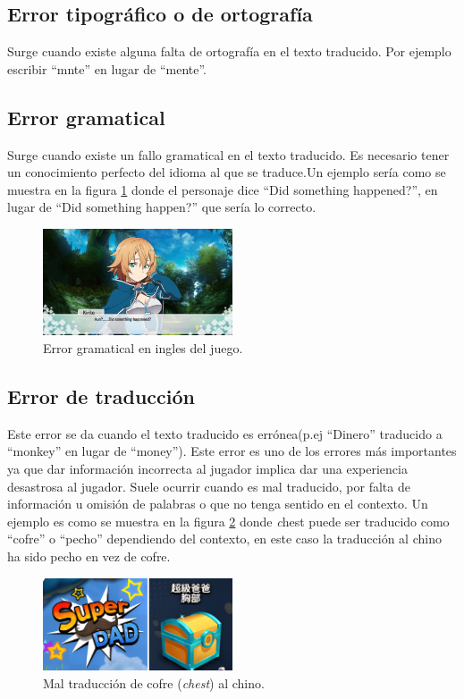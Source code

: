 \subsection{Error tipográfico o de ortografía}\label{ErrorTypo}
Surge cuando existe alguna falta de ortografía en el texto traducido. Por ejemplo escribir ``mnte'' en lugar de ``mente''.

\subsection{Error gramatical}\label{ErrorGramatical}
Surge cuando existe un fallo gramatical en el texto traducido. Es necesario tener un conocimiento perfecto del idioma al que se traduce.Un ejemplo sería como se muestra en la figura \ref{fig:EGrammar} donde el personaje dice ``Did something happened?'', en lugar de ``Did something happen?'' que sería lo correcto.
\begin{figure}[H]
	\centering
	\includegraphics[width = 0.5\textwidth]{Imagenes/Errores_Localizacion/E_Grammar.png}
	\caption{Error gramatical en ingles del juego.}
	\label{fig:EGrammar}
\end{figure}

\subsection{Error de traducción}\label{ErrorTraducción}
Este error se da cuando el texto traducido es errónea(p.ej ``Dinero'' traducido a ``monkey'' en lugar de ``money''). Este error es uno de los errores más importantes ya que dar información incorrecta al jugador implica dar una experiencia desastrosa al jugador.
Suele ocurrir cuando es mal traducido, por falta de información u omisión de palabras o que no tenga sentido en el contexto. Un ejemplo es como se muestra en la figura \ref{fig:ETraduccion} donde \textit chest puede ser traducido como ``cofre'' o ``pecho'' dependiendo del contexto, en este caso la traducción al chino ha sido pecho en vez de cofre.
\begin{figure}[H]
	\centering
	\includegraphics[width = 0.5\textwidth]{Imagenes/Errores_Localizacion/E_Traduccion.png}
	\caption{Mal traducción de cofre (\textit{chest}) al chino.}
	\label{fig:ETraduccion}
\end{figure}

